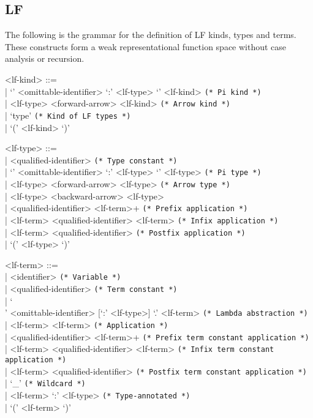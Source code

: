 \documentclass[11pt]{article}
\newcommand{\LF}{\textsc{LF}\xspace}
\begin{document}
\subsection{\LF}\label{section:syntax-lf}

The following is the grammar for the definition of \LF kinds, types and terms.
These constructs form a weak representational function space without case analysis or recursion.

\begin{grammar}
<lf-kind> ::= \hfill\\
| `{' <omittable-identifier> `:' <lf-type> `}' <lf-kind> \hfill \texttt{(* Pi kind *)}\\
| <lf-type> <forward-arrow> <lf-kind> \hfill \texttt{(* Arrow kind *)}\\
| `type' \hfill \texttt{(* Kind of LF types *)}\\
| `(' <lf-kind> `)'

<lf-type> ::= \hfill\\
| <qualified-identifier> \hfill \texttt{(* Type constant *)}\\
| `{' <omittable-identifier> `:' <lf-type> `}' <lf-type> \hfill \texttt{(* Pi type *)}\\
| <lf-type> <forward-arrow> <lf-type> \hfill \texttt{(* Arrow type *)}\\
| <lf-type> <backward-arrow> <lf-type>\\
| <qualified-identifier> <lf-term>+ \hfill \texttt{(* Prefix application *)}\\
| <lf-term> <qualified-identifier> <lf-term> \hfill \texttt{(* Infix application *)}\\
| <lf-term> <qualified-identifier> \hfill \texttt{(* Postfix application *)}\\
| `(' <lf-type> `)'

<lf-term> ::= \hfill\\
| <identifier> \hfill \texttt{(* Variable *)}\\
| <qualified-identifier> \hfill \texttt{(* Term constant *)}\\
| `\\' <omittable-identifier> [`:' <lf-type>] `.' <lf-term> \hfill \texttt{(* Lambda abstraction *)}\\
| <lf-term> <lf-term> \hfill \texttt{(* Application *)}\\
| <qualified-identifier> <lf-term>+ \hfill \texttt{(* Prefix term constant application *)}\\
| <lf-term> <qualified-identifier> <lf-term> \hfill \texttt{(* Infix term constant application *)}\\
| <lf-term> <qualified-identifier> \hfill \texttt{(* Postfix term constant application *)}\\
| `_' \hfill \texttt{(* Wildcard *)}\\
| <lf-term> `:' <lf-type> \hfill \texttt{(* Type-annotated *)}\\
| `(' <lf-term> `)'
\end{grammar}
\end{document}

